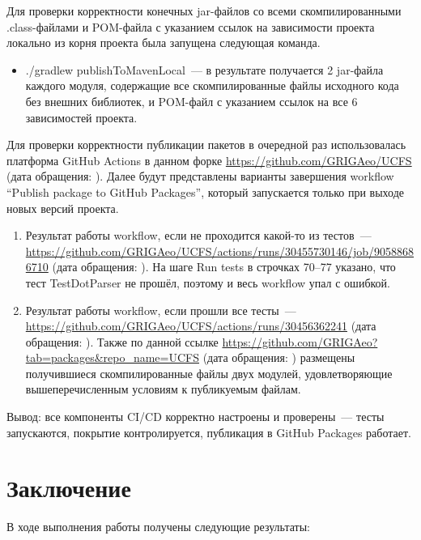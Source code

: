 \documentclass[a4paper]{article}
\begin{document}
Для проверки корректности конечных jar-файлов со всеми скомпилированными .class-файлами и POM-файла с указанием ссылок на зависимости проекта локально из корня проекта была запущена следующая команда.
\begin{itemize}
    \item ./gradlew publishToMavenLocal~--- в результате получается 2 jar-файла каждого модуля, содержащие все скомпилированные файлы исходного кода без внешних библиотек, и POM-файл с указанием ссылок на все 6 зависимостей проекта.
\end{itemize}

Для проверки корректности публикации пакетов в очередной раз использовалась платформа GitHub Actions в данном форке \url{https://github.com/GRIGAeo/UCFS} (дата обращения: ). Далее будут представлены варианты завершения workflow \foreignquote{english}{Publish package to GitHub Packages}, который запускается только при выходе новых версий проекта.
\begin{enumerate}
    \item Результат работы workflow, если не проходится какой-то из тестов~--- \url{https://github.com/GRIGAeo/UCFS/actions/runs/30455730146/job/90588686710} (дата обращения: ). На шаге Run tests в строчках 70--77 указано, что тест TestDotParser не прошёл, поэтому и весь workflow упал с ошибкой.
    \item Результат работы workflow, если прошли все тесты~--- \url{https://github.com/GRIGAeo/UCFS/actions/runs/30456362241} (дата обращения: ). Также по данной ссылке \url{https://github.com/GRIGAeo?tab=packages&repo_name=UCFS} (дата обращения: ) размещены получившиеся скомпилированные файлы двух модулей, удовлетворяющие вышеперечисленным условиям к публикуемым файлам.
\end{enumerate}

Вывод: все компоненты CI/CD корректно настроены и проверены~--- тесты запускаются, покрытие контролируется, публикация в GitHub Packages работает.

\section{Заключение}

В ходе выполнения работы получены следующие результаты:
\end{document}
